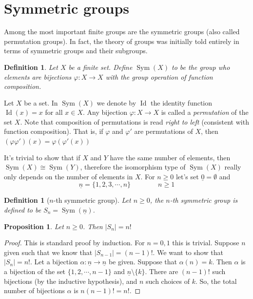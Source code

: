 \documentclass[12pt]{article}
\numberwithin{equation}{subsection}
\newtheorem{prop}[subsection]{Proposition}
\newtheorem{defn}[subsection]{Definition}
\theoremstyle{note}
\newcommand{\Sym}{\operatorname{Sym}}
\newcommand{\Id}{\operatorname{Id}}
\begin{document}
\section{Symmetric groups}

Among the most important finite groups are the symmetric groups (also called permutation groups). In fact, the theory of groups was initially told entirely in terms of symmetric groups and their subgroups.



\begin{defn}
Let $X$ be a finite set. Define $\Sym(X)$ to be the group who elements are bijections $\varphi\colon X\to X$ with the group operation of function composition.
\end{defn}

Let $X$ be a set. In $\Sym(X)$ we denote by $\Id$ the identity function $\Id(x)=x$ for all $x\in X$. Any bijection $\varphi\colon X\to X$ is called a \textit{permutation} of the set $X$. Note that composition of permutations is read \textit{right to left} (consistent with function composition). That is, if $\varphi$ and $\varphi'$ are permutations of $X$, then $(\varphi\varphi')(x)=\varphi(\varphi'(x))$

It's trivial to show that if $X$ and $Y$ have the same number of elements, then $\Sym(X)\cong \Sym(Y)$, therefore the isomorphism type of $\Sym(X)$ really only depends on the number of elements in $X$. For $n\geq 0$ let's set $\underline{0}=\emptyset$ and \begin{equation} \underline{n}=\{1,2,3,\cdots,n\} \qquad \qquad n\geq 1\end{equation}

\begin{defn}[$n$-th symmetric group]
	Let $n\geq 0$, the $n$-th symmetric group is defined to be $S_n=\Sym(\underline{n})$. 
\end{defn}

\begin{prop}
	Let $n\geq 0$. Then $|S_n|=n!$
\end{prop}

\begin{proof}
	This is standard proof by induction. For $n=0,1$ this is trivial. Suppose $n$ given such that we know that $|S_{n-1}|=(n-1)!$. We want to show that $|S_n|=n!$. Let a bijection $\alpha\colon \underline{n}\to \underline{n}$ be given. Suppose that $\alpha(n)=k$. Then $\alpha$ is a bijection of the set $\{1,2,\cdots,n-1\}$ and $\underline{n}\setminus \{k\}$. There are $(n-1)!$ such bijections (by the inductive hypothesis), and $n$ such choices of $k$. So, the total number of bijections $\alpha$ is $n(n-1)!=n!$.
\end{proof}
\end{document}
